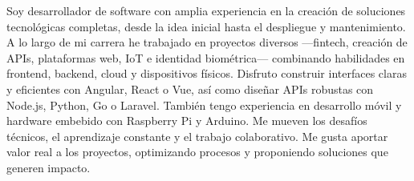%
%
%
\par{
\begin{spacing}{1.25}Soy desarrollador de software con amplia experiencia en la creación de soluciones tecnológicas completas, desde la idea inicial hasta el despliegue y mantenimiento. A lo largo de mi carrera he trabajado en proyectos diversos —fintech, creación de APIs, plataformas web, IoT e identidad biométrica— combinando habilidades en frontend, backend, cloud y dispositivos físicos. Disfruto construir interfaces claras y eficientes con Angular, React o Vue, así como diseñar APIs robustas con Node.js, Python, Go o Laravel. También tengo experiencia en desarrollo móvil y hardware embebido con Raspberry Pi y Arduino. Me mueven los desafíos técnicos, el aprendizaje constante y el trabajo colaborativo. Me gusta aportar valor real a los proyectos, optimizando procesos y proponiendo soluciones que generen impacto.\end{spacing}
}